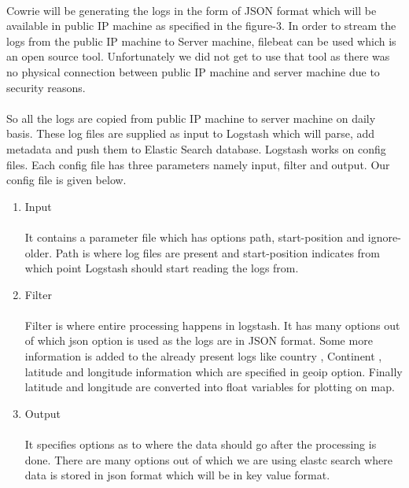 \documentclass{article}
\begin{document}
\paragraph{}
Cowrie will be generating the logs in the form of JSON format which will be available in public IP machine as specified in the figure-3. In order to stream the logs from the public IP machine to Server machine, filebeat can be used which is an open source tool. Unfortunately we did not get to use that tool as there was no physical connection between public IP machine and server machine due to security reasons. 

\paragraph{}
So all the logs are copied from public IP machine to server machine on daily basis. These log files are supplied as input to Logstash which will parse, add metadata and push them to Elastic Search database. Logstash works on config files. Each config file has three parameters namely input, filter and output. Our config file is given below.



\begin{enumerate}
\item Input
\paragraph{}
It contains a parameter file which has options path, start-position and ignore-older. Path is where log files are present and start-position indicates from which point Logstash should start reading the logs from.
\item Filter
\paragraph{}
Filter is where entire processing happens in logstash. It has many options out of which json option is used as the logs are in JSON format. Some more information is added to the already present logs like country , Continent , latitude and longitude information which are specified in geoip option. Finally latitude and longitude are converted into float variables for plotting on map.
\item Output
\paragraph{}
It specifies options as to where the data should go after the processing is done. There are many options out of which we are using elastc search where data is stored in json format which will be in key value format.
\end{enumerate}
\end{document}

